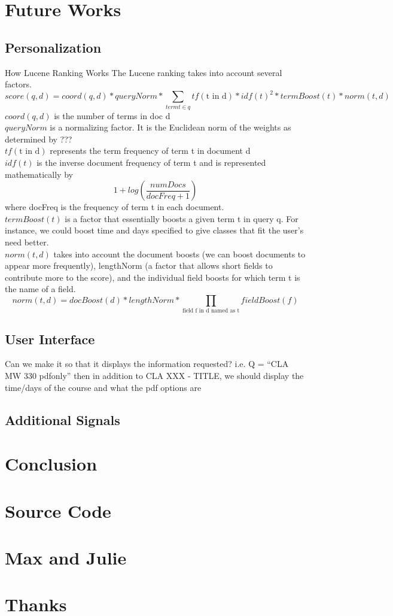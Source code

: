 \documentclass[12pt,letterpaper]{article}
\begin{document}
\section{Future Works}
	\subsection{Personalization}
		How Lucene Ranking Works
		The Lucene ranking takes into account several factors. 
		\begin{equation}
			score(q,d) = coord(q,d) * queryNorm * \sum_{term t \in q}{tf(\text{t in d}) * idf(t)^2 * termBoost(t) * norm(t,d)}
		\label{eq:practical}
		\end{equation}
		$coord(q,d)$ is the number of terms in doc d\\
		$queryNorm$ is a normalizing factor. It is the Euclidean norm of the weights as determined by ???\\
		$tf(\text{t in d})$ represents the term frequency of term t in document d \\
		$idf(t)$ is the inverse document frequency of term t and is represented mathematically by \[ 1 + log(\frac{numDocs}{docFreq + 1}) \] where docFreq is the frequency of term t in each document. \\
		$termBoost(t)$ is a factor that essentially boosts a given term t in query q. For instance, we could boost time and days specified to give classes that fit the user's need better.\\
		$norm(t, d)$ takes into account the document boosts (we can boost documents to appear more frequently), lengthNorm (a factor that allows short fields to contribute more to the score), and the individual field boosts for which term t is the name of a field. 
		\[ norm(t,d) = docBoost(d) * lengthNorm * \prod_{\text{field f in d named as t}}{fieldBoost(f)} \] 				
	
	
	\subsection{User Interface}
	Can we make it so that it displays the information requested? i.e. Q = ``CLA MW 330 pdfonly'' then in addition to CLA XXX - TITLE, we should display the time/days of the course and what the pdf options are
	\subsection{Additional Signals}
	
\section{Conclusion}

\appendix

\section{Source Code}
\section{Max and Julie}
\section{Thanks}
\end{document}
